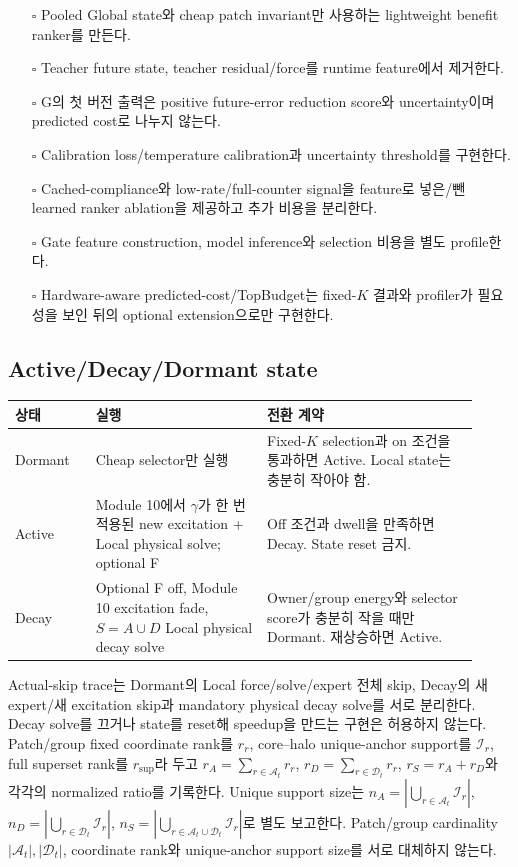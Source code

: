 \documentclass[10pt,a4paper]{article}
\newcommand{\todo}{\textcolor{TodoGray}{\(\square\)}}
\begin{document}
\begin{itemize}
  \item[\todo] Pooled Global state와 cheap patch invariant만 사용하는 lightweight benefit ranker를 만든다.
  \item[\todo] Teacher future state, teacher residual/force를 runtime feature에서 제거한다.
  \item[\todo] G의 첫 버전 출력은 positive future-error reduction score와 uncertainty이며 predicted cost로 나누지 않는다.
  \item[\todo] Calibration loss/temperature calibration과 uncertainty threshold를 구현한다.
  \item[\todo] Cached-compliance와 low-rate/full-counter signal을 feature로 넣은/뺀 learned ranker ablation을 제공하고 추가 비용을 분리한다.
  \item[\todo] Gate feature construction, model inference와 selection 비용을 별도 profile한다.
  \item[\todo] Hardware-aware predicted-cost/TopBudget는 fixed-\(K\) 결과와 profiler가 필요성을 보인 뒤의 optional extension으로만 구현한다.
\end{itemize}

\subsection*{Active/Decay/Dormant state}

\begin{longtable}{L{0.16\linewidth}L{0.34\linewidth}L{0.42\linewidth}}
\toprule
상태 & 실행 & 전환 계약 \\
\midrule
Dormant & Cheap selector만 실행 & Fixed-\(K\) selection과 on 조건을 통과하면 Active. Local state는 충분히 작아야 함. \\
Active & Module 10에서 \(\gamma\)가 한 번 적용된 new excitation + Local physical solve; optional F & Off 조건과 dwell을 만족하면 Decay. State reset 금지. \\
Decay & Optional F off, Module 10 excitation fade, \(S=A\cup D\) Local physical decay solve & Owner/group energy와 selector score가 충분히 작을 때만 Dormant. 재상승하면 Active. \\
\bottomrule
\end{longtable}

Actual-skip trace는 Dormant의 Local force/solve/expert 전체 skip,
Decay의 새 expert/새 excitation skip과 mandatory physical decay solve를 서로 분리한다.
Decay solve를 끄거나 state를 reset해 speedup을 만드는 구현은 허용하지 않는다.
Patch/group fixed coordinate rank를 \(r_r\), core--halo unique-anchor support를
\(\mathcal I_r\), full superset rank를 \(r_{\mathrm{sup}}\)라 두고
\(r_A=\sum_{r\in\mathcal A_t}r_r\),
\(r_D=\sum_{r\in\mathcal D_t}r_r\),
\(r_S=r_A+r_D\)와 각각의 normalized ratio를 기록한다.
Unique support size는
\(n_A=|\bigcup_{r\in\mathcal A_t}\mathcal I_r|\),
\(n_D=|\bigcup_{r\in\mathcal D_t}\mathcal I_r|\),
\(n_S=|\bigcup_{r\in\mathcal A_t\cup\mathcal D_t}\mathcal I_r|\)로 별도 보고한다.
Patch/group cardinality \(|\mathcal A_t|,|\mathcal D_t|\), coordinate rank와
unique-anchor support size를 서로 대체하지 않는다.
\end{document}
